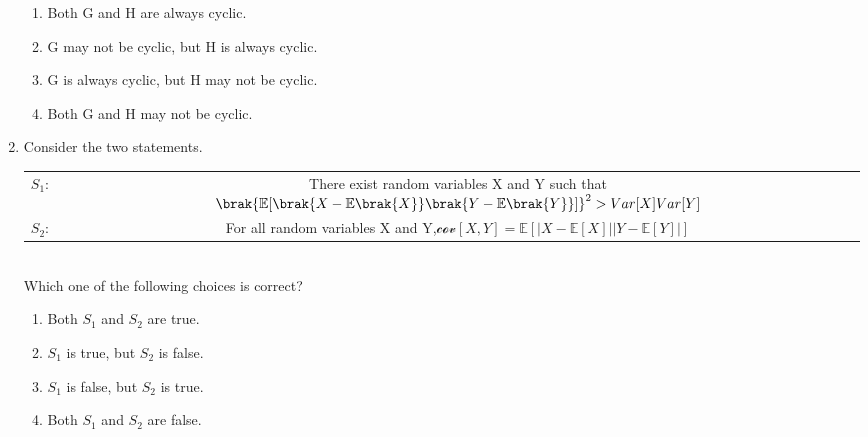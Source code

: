 \documentclass[a4paper, 11pt]{article}
\begin{document}
\begin{enumerate}
    \hfill{}
    \begin{enumerate}
        \item Both G and H are always cyclic.
        \item G may not be cyclic, but H is always cyclic.
        \item G is always cyclic, but H may not be cyclic.
        \item Both G and H may not be cyclic.
    \end{enumerate}
    
    \item Consider the two statements.\\
    \begin{tabular}{cc}
    \centering
        $S_1$: & There exist random variables X and Y such that $\brak{\mathbb{E}[\brak{X-\mathbb{E}\brak{X}}\brak{Y-\mathbb{E}\brak{Y}}]}^2 > Var[X]Var[Y]$ \\
        $S_2$: & For all random variables X and Y,$\mathcal{cov}[X,Y] = \mathbb{E}[|X-\mathbb{E}[X]||Y-\mathbb{E}[Y]|]$
    \end{tabular}\\
    Which one of the following choices is correct?
    \begin{enumerate}
        \item Both $S_1$ and $S_2$ are true.
        \item $S_1$ is true, but $S_2$ is false.
        \item $S_1$ is false, but $S_2$ is true.
        \item Both $S_1$ and $S_2$ are false.
    \end{enumerate}
    \hfill{}
    

\end{enumerate}
\end{document}

